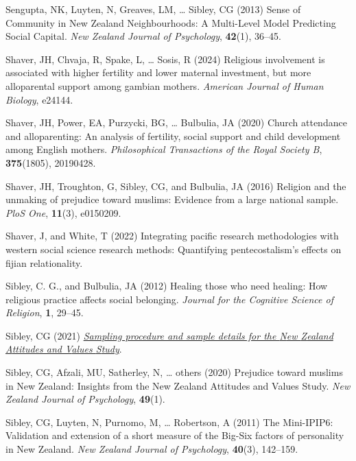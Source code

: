 \documentclass[
  single column]{article}
\newlength{\cslhangindent}
\newenvironment{CSLReferences}[2] %
 {\begin{list}{}{%
  \setlength{\itemindent}{0pt}
  \setlength{\leftmargin}{0pt}
  \setlength{\parsep}{0pt}
  \ifodd #1
   \setlength{\leftmargin}{\cslhangindent}
   \setlength{\itemindent}{-1\cslhangindent}
  \fi
  \setlength{\itemsep}{#2\baselineskip}}}
 {\end{list}}
\begin{document}
\begin{CSLReferences}{1}{0}
Sengupta, NK, Luyten, N, Greaves, LM, \ldots{} Sibley, CG (2013) Sense
of Community in {N}ew {Z}ealand Neighbourhoods: A Multi-Level Model
Predicting Social Capital. \emph{New Zealand Journal of Psychology},
\textbf{42}(1), 36--45.

Shaver, JH, Chvaja, R, Spake, L, \ldots{} Sosis, R (2024) Religious
involvement is associated with higher fertility and lower maternal
investment, but more alloparental support among gambian mothers.
\emph{American Journal of Human Biology}, e24144.

Shaver, JH, Power, EA, Purzycki, BG, \ldots{} Bulbulia, JA (2020) Church
attendance and alloparenting: An analysis of fertility, social support
and child development among {E}nglish mothers. \emph{Philosophical
Transactions of the Royal Society B}, \textbf{375}(1805), 20190428.

Shaver, JH, Troughton, G, Sibley, CG, and Bulbulia, JA (2016) Religion
and the unmaking of prejudice toward muslims: Evidence from a large
national sample. \emph{PloS One}, \textbf{11}(3), e0150209.

Shaver, J, and White, T (2022) Integrating pacific research
methodologies with western social science research methods: Quantifying
pentecostalism's effects on fijian relationality.

Sibley, C. G., and Bulbulia, JA (2012) Healing those who need healing:
How religious practice affects social belonging. \emph{Journal for the
Cognitive Science of Religion}, \textbf{1}, 29--45.

Sibley, CG (2021)
\emph{\href{https://doi.org/10.31234/osf.io/wgqvy}{Sampling procedure
and sample details for the {N}ew {Z}ealand {A}ttitudes and {V}alues
{S}tudy}}.

Sibley, CG, Afzali, MU, Satherley, N, \ldots{} others (2020) Prejudice
toward muslims in {N}ew {Z}ealand: Insights from the {N}ew {Z}ealand
{A}ttitudes and {V}alues {S}tudy. \emph{New Zealand Journal of
Psychology}, \textbf{49}(1).

Sibley, CG, Luyten, N, Purnomo, M, \ldots{} Robertson, A (2011) The
Mini-IPIP6: Validation and extension of a short measure of the Big-Six
factors of personality in {N}ew {Z}ealand. \emph{New Zealand Journal of
Psychology}, \textbf{40}(3), 142--159.


\end{CSLReferences}
\end{document}
